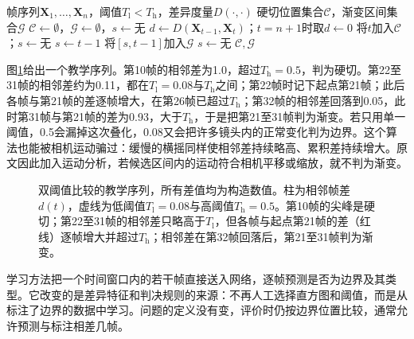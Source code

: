 \begin{algorithm}[双阈值比较]
  \label{alg:vision-videofound-twin}
  \begin{algorithmic}[1]
    \Require 帧序列$\bm X_1,\ldots,\bm X_n$，阈值$T_{\mathrm l}<T_{\mathrm h}$，差异度量$D(\cdot,\cdot)$
    \Ensure 硬切位置集合$\mathcal{C}$，渐变区间集合$\mathcal{G}$
    \State $\mathcal C\gets\emptyset$，$\mathcal G\gets\emptyset$，$s\gets\text{无}$
      \State $d\gets D(\bm X_{t-1},\bm X_t)$；$t=n+1$时取$d\gets0$
        \State 将$t$加入$\mathcal C$；$s\gets\text{无}$
          \State $s\gets t-1$
        \EndIf
          \State 将$[s,t-1]$加入$\mathcal G$
        \EndIf
        \State $s\gets\text{无}$
      \EndIf
    \EndFor
    \State \Return $\mathcal C,\mathcal G$
  \end{algorithmic}
\end{algorithm}

图\ref{fig:vision-videofound-twin-comparison}给出一个教学序列。第10帧的相邻差为1.0，超过$T_{\mathrm h}=0.5$，判为硬切。第22至31帧的相邻差约为0.11，都在$T_{\mathrm l}=0.08$与$T_{\mathrm h}$之间；第22帧时记下起点第21帧；此后各帧与第21帧的差逐帧增大，在第26帧已超过$T_{\mathrm h}$；第32帧的相邻差回落到0.05，此时第31帧与第21帧的差为0.93，大于$T_{\mathrm h}$，于是把第21至31帧判为渐变。若只用单一阈值，0.5会漏掉这次叠化，0.08又会把许多镜头内的正常变化判为边界。这个算法也能被相机运动骗过：缓慢的横摇同样使相邻差持续略高、累积差持续增大。原文因此加入运动分析，若候选区间内的运动符合相机平移或缩放，就不判为渐变。

\begin{figure}[htbp]
  \centering
  
  \caption{双阈值比较的教学序列，所有差值均为构造数值。柱为相邻帧差$d(t)$，虚线为低阈值$T_{\mathrm l}=0.08$与高阈值$T_{\mathrm h}=0.5$。第10帧的尖峰是硬切；第22至31帧的相邻差只略高于$T_{\mathrm l}$，但各帧与起点第21帧的差（红线）逐帧增大并超过$T_{\mathrm h}$；相邻差在第32帧回落后，第21至31帧判为渐变。}
  \label{fig:vision-videofound-twin-comparison}
\end{figure}

学习方法把一个时间窗口内的若干帧直接送入网络，逐帧预测是否为边界及其类型。它改变的是差异特征和判决规则的来源：不再人工选择直方图和阈值，而是从标注了边界的数据中学习。问题的定义没有变，评价时仍按边界位置比较，通常允许预测与标注相差几帧。

